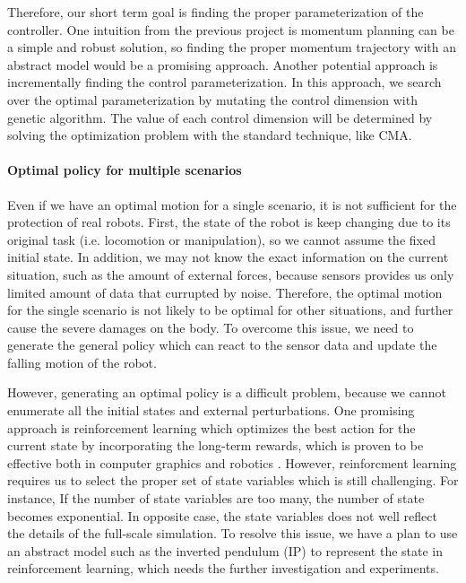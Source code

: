 Therefore, our short term goal is finding the proper parameterization
of the controller.
One intuition from the previous project is
momentum planning can be a simple and robust solution, so finding the 
proper momentum trajectory with an abstract model would be 
a promising approach.
Another potential approach is incrementally finding the control 
parameterization. 
In this approach, we search over the optimal parameterization by 
mutating the control dimension with genetic algorithm.
The value of each control dimension will be determined by solving
the optimization problem with the standard technique, like CMA.


\paragraph{Optimal policy for multiple scenarios}

Even if we have an optimal motion for a single scenario,
it is not sufficient for the protection of real robots.
First, the state of the robot is keep changing due to its original
task (i.e. locomotion or manipulation), so we cannot assume
the fixed initial state.
In addition, we may not know the exact information on the current
situation, such as the amount of external forces, because sensors
provides us only limited amount of data that currupted by noise.
Therefore, the optimal motion for the single scenario is not likely 
to be optimal for other situations, and further cause the severe damages
on the body.
To overcome this issue, we need to generate the general policy which 
can react to the sensor data and update the falling motion of the robot.

However, generating an optimal policy is a difficult problem,
because we cannot enumerate all the initial states and external
perturbations.
One promising approach is reinforcement learning which optimizes
the best action for the current state by incorporating the long-term
rewards, which is proven to be effective both in computer graphics
\cite{Coros:2009:RTC} and robotics \cite{Morimoto:2004:SRL}.
However, reinforcment learning requires us to select the proper set
of state variables which is still challenging.
For instance, If the number of state variables are too many, 
the number of state becomes exponential.
In opposite case, the state variables does not well reflect the 
details of the full-scale simulation.
To resolve this issue, we have a plan to use an abstract model such as the 
inverted pendulum (IP) to represent the state in reinforcement learning,
which needs the further investigation and experiments.

